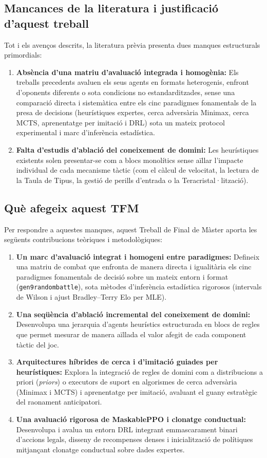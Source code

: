 \subsection{Mancances de la literatura i justificació d'aquest treball}

Tot i els avenços descrits, la literatura prèvia presenta dues manques estructurals primordials:
\begin{enumerate}
    \item \textbf{Absència d'una matriu d'avaluació integrada i homogènia:} Els treballs precedents avaluen els seus agents en formats heterogenis, enfront d'oponents diferents o sota condicions no estandarditzades, sense una comparació directa i sistemàtica entre els cinc paradigmes fonamentals de la presa de decisions (heurístiques expertes, cerca adversària Minimax, cerca MCTS, aprenentatge per imitació i DRL) sota un mateix protocol experimental i marc d'inferència estadística.
    \item \textbf{Falta d'estudis d'ablació del coneixement de domini:} Les heurístiques existents solen presentar-se com a blocs monolítics sense aïllar l'impacte individual de cada mecanisme tàctic (com el càlcul de velocitat, la lectura de la Taula de Tipus, la gestió de perills d'entrada o la Teracristal·lització).
\end{enumerate}

\subsection{Què afegeix aquest TFM}

Per respondre a aquestes manques, aquest Treball de Final de Màster aporta les següents contribucions teòriques i metodològiques:
\begin{enumerate}
    \item \textbf{Un marc d'avaluació integrat i homogeni entre paradigmes:} Defineix una matriu de combat que enfronta de manera directa i igualitària els cinc paradigmes fonamentals de decisió sobre un mateix entorn i format (\texttt{gen9randombattle}), sota mètodes d'inferència estadística rigorosos (intervals de Wilson i ajust Bradley--Terry Elo per MLE).
    \item \textbf{Una seqüència d'ablació incremental del coneixement de domini:} Desenvolupa una jerarquia d'agents heurístics estructurada en blocs de regles que permet mesurar de manera aïllada el valor afegit de cada component tàctic del joc.
    \item \textbf{Arquitectures híbrides de cerca i d'imitació guiades per heurístiques:} Explora la integració de regles de domini com a distribucions a priori (\emph{priors}) o executors de suport en algorismes de cerca adversària (Minimax i MCTS) i aprenentatge per imitació, avaluant el guany estratègic del raonament anticipatori.
    \item \textbf{Una avaluació rigorosa de MaskablePPO i clonatge conductual:} Desenvolupa i avalua un entorn DRL integrant emmascarament binari d'accions legals, disseny de recompenses denses i inicialització de polítiques mitjançant clonatge conductual sobre dades expertes.
\end{enumerate}

